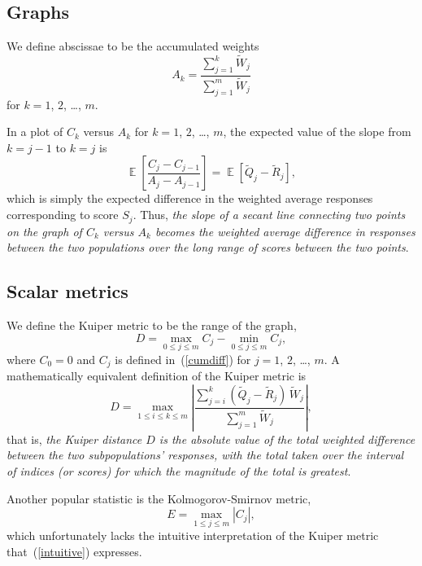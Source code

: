 \documentclass{article}
\DeclareMathOperator{\E}{\mathop{}\mathbb{E}}
\begin{document}
\subsection{Graphs}
\label{graphs}

We define abscissae to be the accumulated weights
%
\begin{equation}
A_k = \frac{\sum_{j=1}^k \tilde{W}_j}{\sum_{j=1}^m \tilde{W}_j}
\end{equation}
%
for $k = 1$, $2$, \dots, $m$.

In a plot of $C_k$ versus $A_k$ for $k = 1$, $2$, \dots, $m$,
the expected value of the slope from $k = j - 1$ to $k = j$ is
%
\begin{equation}
\E\left[ \frac{C_j - C_{j-1}}{A_j - A_{j-1}} \right]
= \E\left[ \tilde{Q}_j - \tilde{R}_j \right],
\end{equation}
%
which is simply the expected difference in the weighted average responses
corresponding to score $S_j$.
Thus, {\it the slope of a secant line connecting two points
on the graph of $C_k$ versus $A_k$ becomes the weighted average difference
in responses between the two populations over the long range of scores
between the two points}.


\subsection{Scalar metrics}
\label{metrics}

We define the Kuiper metric to be the range of the graph,
%
\begin{equation}
D = \max_{0 \le j \le m} C_j - \min_{0 \le j \le m} C_j,
\end{equation}
%
where $C_0 = 0$ and $C_j$ is defined in~(\ref{cumdiff})
for $j = 1$, $2$, \dots, $m$.
A mathematically equivalent definition of the Kuiper metric is
%
\begin{equation}
\label{intuitive}
D = \max_{1 \le i \le k \le m}
    \left| \frac{\sum_{j = i}^k (\tilde{Q}_j - \tilde{R}_j) \, \tilde{W}_j}
                {\sum_{j=1}^m \tilde{W}_j} \right|,
\end{equation}
%
that is, {\it the Kuiper distance $D$ is the absolute value
of the total weighted difference between the two subpopulations' responses,
with the total taken over the interval of indices (or scores)
for which the magnitude of the total is greatest}.

Another popular statistic is the Kolmogorov-Smirnov metric,
%
\begin{equation}
E = \max_{1 \le j \le m} |C_j|,
\end{equation}
%
which unfortunately lacks the intuitive interpretation of the Kuiper metric
that~(\ref{intuitive}) expresses.
\end{document}
